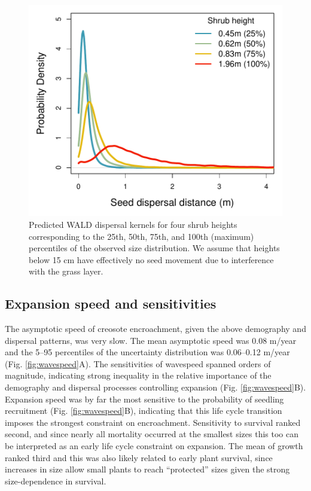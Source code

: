 \documentclass[11pt]{article}\usepackage[]{graphicx}\usepackage[usenames,dvipsnames]{xcolor}
\begin{document}
\begin{figure}[H]
  \begin{center}
    \includegraphics[width=\linewidth]{Figures/Dkernels}
  \caption{Predicted WALD dispersal kernels for four shrub heights corresponding to the 25th, 50th, 75th, and 100th (maximum) percentiles of the observed size distribution. We assume that heights below 15 cm have effectively no seed movement due to interference with the grass layer.}
  \label{fig:dispersal}
  \end{center}
\end{figure}

\subsection*{Expansion speed and sensitivities}
The asymptotic speed of creosote encroachment, given the above demography and dispersal patterns, was very slow. 
The mean asymptotic speed was 0.08 m/year and the 5--95 percentiles of the uncertainty distribution was 0.06--0.12 m/year (Fig. \ref{fig:wavespeed}A). 
The sensitivities of wavespeed spanned orders of magnitude, indicating strong inequality in the relative importance of the demography and dispersal processes controlling expansion (Fig. \ref{fig:wavespeed}B).
Expansion speed was by far the most sensitive to the probability of seedling recruitment (Fig. \ref{fig:wavespeed}B), indicating that this life cycle transition imposes the strongest constraint on encroachment. 
Sensitivity to survival ranked second, and since nearly all mortality occurred at the smallest sizes this too can be interpreted as an early life cycle constraint on expansion. 
The mean of growth ranked third and this was also likely related to early plant survival, since increases in size allow small plants to reach ``protected'' sizes given the strong size-dependence in survival. 
\end{document}
